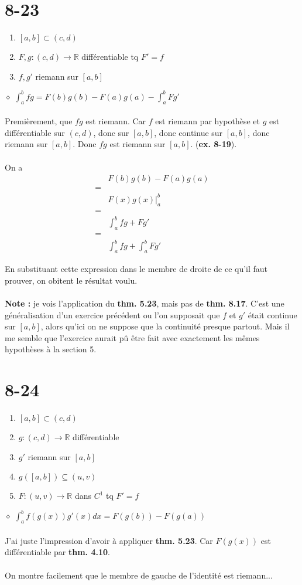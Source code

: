 \documentclass[a4paper,10pt]{article}
\begin{document}
\section*{8-23}
\begin{enumerate}
 \item $[a,b] \subset (c,d)$
 \item $F,g : (c,d) \rightarrow \mathbb{R}$ différentiable tq $F' = f$
 \item $f,g'$ riemann sur $[a,b]$
\end{enumerate}
$\diamond$ $\int_a^b fg = F(b)g(b) - F(a)g(a) - \int_a^b F g'$
\\
\\
Premièrement, que $fg$ est riemann. Car $f$ est riemann par hypothèse et $g$ est différentiable sur
$(c,d)$, donc sur $[a,b]$, donc continue sur $[a,b]$, donc riemann sur $[a,b]$. Donc $fg$ est riemann sur
$[a,b]$. (\textbf{ex. 8-19}).
\\
\\
On a 
\begin{align*}
 & F(b)g(b) - F(a)g(a) \\
 = \\
 &  F(x)g(x) | _a^b \\
 = \\
 & \int_a^b fg + Fg' \\
 = \\
 & \int_a^b fg + \int_a^b Fg'
\end{align*}

En substituant cette expression dans le membre de droite de ce qu'il faut prouver, on obitent le résultat voulu.
\\
\\
\textbf{Note :} je vois l'application du \textbf{thm. 5.23}, mais pas de \textbf{thm. 8.17}. C'est une généralisation d'un
exercice précédent ou l'on supposait que $f$ et $g'$ était continue sur $[a,b]$, alors qu'ici on ne suppose que la 
continuité presque partout. Mais il me semble que l'exercice aurait pû être fait avec exactement les mêmes hypothèses à
la section 5.

\section*{8-24}
\begin{enumerate}
 \item $[a,b] \subset (c,d)$
 \item $g : (c,d) \rightarrow \mathbb{R}$ différentiable
 \item $g'$ riemann sur $[a,b]$
 \item $g([a,b]) \subseteq (u,v)$
 \item $F : (u,v) \rightarrow \mathbb{R}$ dans $C^1$ tq $F' = f$
\end{enumerate}
$\diamond$ $\int_a^b f(g(x)) g'(x) dx = F(g(b)) - F(g(a))$
\\
\\
J'ai juste l'impression d'avoir à appliquer \textbf{thm. 5.23}. Car $F(g(x))$ est différentiable par \textbf{thm. 4.10}.
\\
\\
On montre facilement que le membre de gauche de l'identité est riemann...
\end{document}
